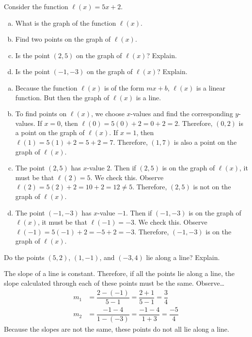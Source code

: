 \documentclass[11pt,letterpaper]{article}
\begin{document}


 Consider the function $\ell(x)= 5x + 2$.

\begin{enumerate}[(a)]
\item What is the graph of the function $\ell(x)$.
\item Find two points on the graph of $\ell(x)$.
\item Is the point $(2, 5)$ on the graph of $\ell(x)$? Explain. 
\item Is the point $(-1, -3)$ on the graph of $\ell(x)$? Explain. 
\end{enumerate} \pspace

\sol

\begin{enumerate}[(a)]
\item Because the function $\ell(x)$ is of the form $mx + b$, $\ell(x)$ is a linear function. But then the graph of $\ell(x)$ is a line. 

\item To find points on $\ell(x)$, we choose $x$-values and find the corresponding $y$-values. If $x= 0$, then $\ell(0)= 5(0) + 2= 0 + 2= 2$. Therefore, $(0, 2)$ is a point on the graph of $\ell(x)$. If $x= 1$, then $\ell(1)= 5(1) + 2= 5 + 2= 7$. Therefore, $(1, 7)$ is also a point on the graph of $\ell(x)$. 

\item The point $(2, 5)$ has $x$-value $2$. Then if $(2, 5)$ is on the graph of $\ell(x)$, it must be that $\ell(2)= 5$. We check this. Observe $\ell(2)= 5(2) + 2= 10 + 2= 12 \neq 5$. Therefore, $(2, 5)$ is not on the graph of $\ell(x)$. 

\item The point $(-1, -3)$ has $x$-value $-1$. Then if $(-1, -3)$ is on the graph of $\ell(x)$, it must be that $\ell(-1)= -3$. We check this. Observe $\ell(-1)= 5(-1) + 2= -5 + 2= -3$. Therefore, $(-1, -3)$ is on the graph of $\ell(x)$. 
\end{enumerate}





\newpage





 Do the points $(5, 2)$, $(1, -1)$, and $(-3, 4)$ lie along a line? Explain. \pspace

\sol The slope of a line is constant. Therefore, if all the points lie along a line, the slope calculated through each of these points must be the same. Observe\dots
	\[
	\begin{aligned}
	m_1&= \dfrac{2 - (-1)}{5 - 1}= \dfrac{2 + 1}{5 - 1}= \dfrac{3}{4} \\[0.3cm]
	m_2&= \dfrac{-1 - 4}{1 - (-3)}= \dfrac{-1 - 4}{1 + 3}= \dfrac{-5}{4}
	\end{aligned}
	\]
Because the slopes are not the same, these points do not all lie along a line. 
\end{document}
